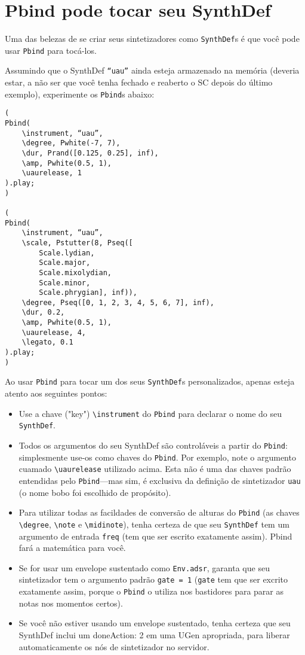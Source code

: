 \section{Pbind pode tocar seu SynthDef}

Uma das belezas de se criar seus sintetizadores como \texttt{SynthDef}s é que você pode usar \texttt{Pbind} para tocá-los.

Assumindo que o SynthDef \texttt{“uau”} ainda esteja armazenado na memória (deveria estar, a não ser que você tenha fechado e reaberto o SC depois do último exemplo), experimente os \texttt{Pbind}s abaixo:

\begin{lstlisting}[style=SuperCollider-IDE, basicstyle=\scttfamily\footnotesize]
(
Pbind(
	\instrument, “uau”,
	\degree, Pwhite(-7, 7),
	\dur, Prand([0.125, 0.25], inf),
	\amp, Pwhite(0.5, 1),
	\uaurelease, 1
).play;
)

(
Pbind(
	\instrument, “uau”,
	\scale, Pstutter(8, Pseq([
		Scale.lydian,
		Scale.major,
		Scale.mixolydian,
		Scale.minor,
		Scale.phrygian], inf)),
	\degree, Pseq([0, 1, 2, 3, 4, 5, 6, 7], inf),
	\dur, 0.2,
	\amp, Pwhite(0.5, 1),
	\uaurelease, 4,
	\legato, 0.1
).play;
)
\end{lstlisting}
 
Ao usar \texttt{Pbind} para tocar um dos seus \texttt{SynthDef}s personalizados, apenas esteja atento aos seguintes pontos:

\begin{itemize}
\item Use a chave ("key") \texttt{\textbackslash instrument} do \texttt{Pbind} para declarar o nome do seu \texttt{SynthDef}.
\item Todos os argumentos do seu SynthDef são controláveis a partir do \texttt{Pbind}: simplesmente use-os como chaves do \texttt{Pbind}. Por exemplo, note o argumento cuamado \texttt{\textbackslash uaurelease} utilizado acima. Esta não é uma das chaves padrão entendidas pelo \texttt{Pbind}—mas sim, é exclusiva da definição de sintetizador  \texttt{uau} (o nome bobo foi escolhido de propósito).

\item Para utilizar todas as facildades de conversão de alturas do \texttt{Pbind} (as chaves \texttt{\textbackslash degree}, \texttt{\textbackslash note} e \texttt{\textbackslash midinote}), tenha certeza de que seu \texttt{SynthDef} tem um argumento de entrada \texttt{freq} (tem que ser escrito exatamente assim). Pbind fará a matemática para você.
\item Se for usar um envelope sustentado como \texttt{Env.adsr}, garanta que seu sintetizador tem o argumento padrão \texttt{gate = 1} (\texttt{gate} tem que ser excrito exatamente assim, porque o \texttt{Pbind} o utiliza nos bastidores para parar as notas nos momentos certos).
\item Se você não estiver usando um envelope sustentado, tenha certeza que seu SynthDef inclui um doneAction: 2 em uma UGen apropriada, para liberar automaticamente os nós de sintetizador no servidor.
\end{itemize}

